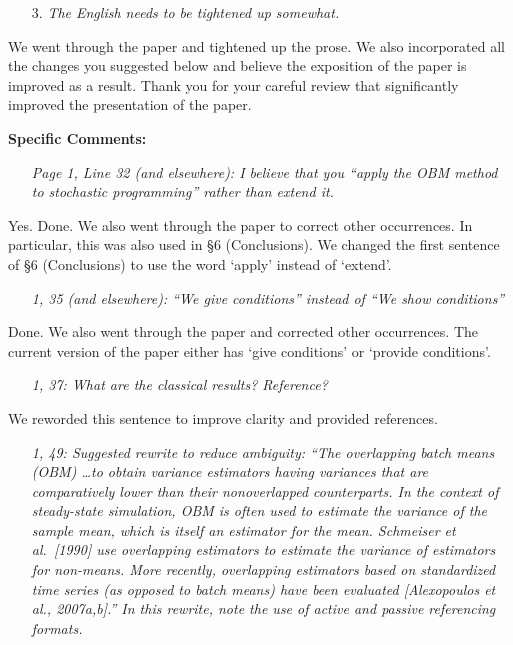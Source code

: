 \documentclass[11pt,notitlepage,onecolumn]{article}
\newcommand{\noi}{\noindent}
\begin{document}
\begin{itemize}
\item[3.] \textit{The English needs to be tightened up somewhat.}
\end{itemize}

\noindent  
We went through the paper and tightened up the prose. 
We also incorporated all the changes you suggested below and believe the exposition of the paper is improved as a result.
Thank you for your careful review that significantly improved the presentation of the paper. 
\medskip 

\bigskip 


\noi  
{\large \bf Specific Comments:}
\medskip 


\begin{itemize}
\item[] \textit{Page 1, Line 32 (and elsewhere): I believe that you ``apply the OBM method to stochastic programming'' rather than extend it.}
\end{itemize}

\noi
Yes. Done.  
We also went through the paper to correct other occurrences. 
In particular, this was also used in \S 6 (Conclusions). 
We changed the first sentence of \S 6 (Conclusions) to use the word `apply' instead of `extend'. 
\medskip 


\begin{itemize}
\item[] \textit{1, 35 (and elsewhere): ``We give conditions'' instead of ``We show conditions''}
\end{itemize}

\noi
Done. 
We also went through the paper and corrected other occurrences. 
The current version of the paper either has `give conditions' or `provide conditions'. 
\medskip 


\begin{itemize}
\item[] \textit{1, 37: What are the classical results? Reference?}
\end{itemize}

\noi
We reworded this sentence to improve clarity and provided references.   
\medskip 



\begin{itemize}
\item[] \textit{1, 49: Suggested rewrite to reduce ambiguity: ``The overlapping batch means (OBM) \ldots to obtain variance estimators having variances that are comparatively lower than their nonoverlapped counterparts. 
In the context of steady-state simulation, OBM is often used to estimate the variance of the sample mean, which is itself an estimator for the mean. 
Schmeiser et al.\ [1990] use overlapping estimators to estimate the
variance of estimators for non-means. 
More recently, overlapping estimators based on standardized time series (as opposed to batch means) have been evaluated [Alexopoulos et al., 2007a,b].'' 
In this rewrite, note the use of active and passive referencing formats.}
\end{itemize}
\end{document}
